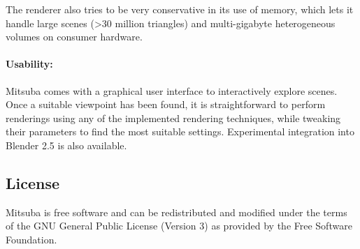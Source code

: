 The renderer also tries to be very conservative in its use of memory, which lets it handle 
large scenes (>30 million triangles) and multi-gigabyte heterogeneous volumes on consumer hardware.

\paragraph{Usability:}
Mitsuba comes with a graphical user interface to interactively explore scenes. Once a suitable 
viewpoint has been found, it is straightforward to perform renderings using any of the 
implemented rendering techniques, while tweaking their parameters to find the most suitable 
settings. Experimental integration into Blender 2.5 is also available.

\subsection{License}
Mitsuba is free software and can be redistributed and modified under the terms of the GNU General 
Public License (Version 3) as provided by the Free Software Foundation.


